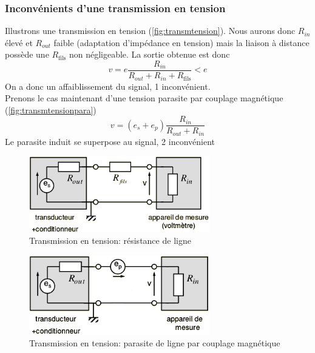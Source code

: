 \subsubsection{Inconvénients d'une transmission en tension}
Illustrons une transmission en tension (\autoref{fig:transmtension}). Nous aurons donc \(R_{in}\) élevé et \(R_{out}\) faible (adaptation d'impédance en tension) mais la liaison à distance possède une \(R_{\text{fils}}\) non négligeable. La sortie obtenue est donc 
\[v = e\frac{R_{in}}{R_{out}+R_{in}+R_{\text{fils}}}<e\]
On a donc un affaiblissement du signal, 1 inconvénient.\\
Prenons le cas maintenant d'une tension parasite par couplage magnétique (\autoref{fig:transmtensionpara})
\[v = (e_s+e_p)\frac{R_{in}}{R_{out}+R_{in}}\]
Le parasite induit se superpose au signal, 2 inconvénient
\begin{figure}[H] 
	\centering 
	\includegraphics[width=0.7\textwidth,height=10\baselineskip,keepaspectratio]{ch3/image23} 
	\caption{Transmission en tension: résistance de ligne} 
	\label{fig:transmtension}
\end{figure}
\begin{figure}[H] 
	\centering 
	\includegraphics[width=0.7\textwidth,height=10\baselineskip,keepaspectratio]{ch3/image24} 
	\caption{Transmission en tension: parasite de ligne par couplage magnétique} 
	\label{fig:transmtensionpara}
\end{figure}
